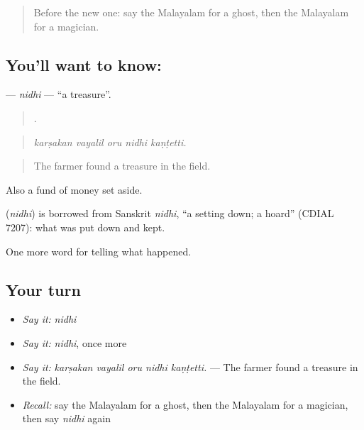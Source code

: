 \label{lesson:ML-C403-nidhi}



\begin{quote}
Before the new one: say the Malayalam for a ghost, then the Malayalam for a magician.
\end{quote}

\subsection*{You'll want to know: }
\textbf{} — \emph{nidhi} — \textquotedblleft{}a treasure\textquotedblright{}.

\begin{quote}
    .
\end{quote}

\begin{quote}
\emph{karṣakan vayalil oru nidhi kaṇṭetti.}
\end{quote}

\begin{quote}
The farmer found a treasure in the field.
\end{quote}

Also a fund of money set aside.

\begin{cousinweb}
\textbf{} (\emph{nidhi}) is borrowed from Sanskrit \emph{nidhi}, \textquotedblleft{}a setting down; a hoard\textquotedblright{} (CDIAL 7207): what was put down and kept.
\end{cousinweb}

\begin{grammarlens}[title={What you've built}]
One more word for telling what happened.
\end{grammarlens}

\subsection*{Your turn}
\begin{itemize}
\raggedright
  \item \emph{Say it:} \emph{nidhi}
  \item \emph{Say it:} \emph{nidhi}, once more
  \item \emph{Say it:} \emph{karṣakan vayalil oru nidhi kaṇṭetti.} — The farmer found a treasure in the field.
  \item \emph{Recall:} say the Malayalam for a ghost, then the Malayalam for a magician, then say \emph{nidhi} again
\end{itemize}

